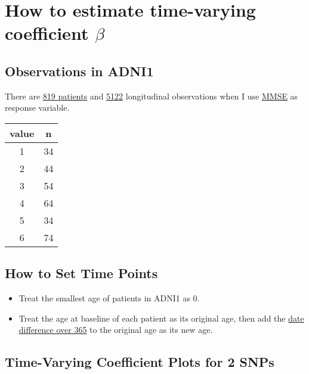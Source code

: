 \section{How to estimate time-varying coefficient $\beta$}



\subsection{Observations in ADNI1}

There are \underline{819 patients} and \underline{5122} longitudinal observations when I use \underline{MMSE} as response variable.


\begin{table}[h]
    \centering
    \begin{tabular}{c|c}
    \hline
       value  & n \\ \hline
       1  & 34 \\
       2  & 44 \\
       3  & 54 \\
       4  & 64 \\
       5  & 34 \\
       6  & 74 \\
     \hline
     \end{tabular}\label{tab:my_label}
\end{table}




\subsection{How to Set Time Points}


\begin{itemize}
     
\item Treat the smallest age of patients in ADNI1 as 0.

\item Treat the age at baseline of each patient as its original age, then add the \underline{date difference over 365} to the original age as its new age.
\end{itemize}




\subsection{Time-Varying Coefficient Plots for 2 SNPs}

